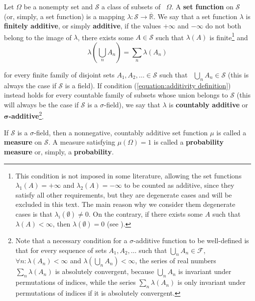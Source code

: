 \begin{defn} Let \(\Omega\) be a nonempty set and \(\mathcal{S}\) a class of subsets of ~\(\Omega\). 
A \textbf{set function} on \(\mathcal{S}\) (or, simply, a set function) is a
mapping \(\lambda\colon\mathcal{S}\to\overline{\mathbb{R}}\).	We say that a set function \(\lambda\) is
\textbf{finitely additive}, or simply \textbf{additive}, if the values
\(+\infty\) and \(-\infty\) do not both belong to the image of \(\lambda\),
there exists some \(A\in\mathcal{S}\) such that \(\lambda(A)\) is finite\footnote{This
condition is not imposed in some literature, allowing the set functions
\(\lambda_{1}(A)=+\infty\) and \(\lambda_{2}(A)=-\infty\) to be counted as
additive, since they satisfy all other requirements, but they are degenerate 
cases and will be excluded in this text. The main reason why we consider them degenerate cases is that \(\lambda_i(\emptyset)\neq 0\). On the contrary, if there exists some \(A\) such that \(\lambda(A)<\infty\), then \(\lambda(\emptyset)=0\) (see ).} and
		\begin{equation}\label{equation:additivity definition} 
				\lambda\left(\bigcup_{n}A_{n}\right)=\sum_{n}\lambda(A_{n})
		\end{equation}
		
		for every finite family of disjoint sets \(A_{1},A_{2},\dotsc\in\mathcal{S}\)
such that ~\(\bigcup_{n}A_{n}\in\mathcal{S}\) (this is always the case if \(\mathcal{S}\) is a field).
If condition (\ref{equation:additivity definition}) instead holds for every countable
family of subsets whose union belongs to \(\mathcal{S}\) (this will always be the case if \(\mathcal{S}\) is a \(\sigma\)-field), we say that \(\lambda\) is \textbf{countably additive} or
\textbf{\(\bm{\sigma}\)-additive}\footnote{Note that a necessary condition for
a \(\sigma\)-additive function to be well-defined is that for every sequence of
sets \(A_{1},A_{2},\dots\) such that \(\bigcup_{n}A_{n}\in\mathcal{F}\),
\(\forall n:\lambda(A_{n})<\infty\) and
\(\lambda(\bigcup_{n}A_{n})<\infty\), the series of real numbers
\(\sum_{n}\lambda(A_{n})\) is absolutely convergent, because
\(\bigcup_{n}A_{n}\) is invariant under permutations of indices, while
the series \(\sum_{n}\lambda(A_{n})\) is only invariant under permutations of indices if it is
absolutely convergent.}.
		
If \(\mathcal{S}\) is a \(\sigma\)-field, then a nonnegative, countably additive set
function \(\mu\) is called a \textbf{measure} on \(\mathcal{S}\). A measure satisfying
\(\mu(\Omega)=1\) is called a \textbf{probability measure} or, simply, a
\textbf{probability}.
\end{defn}

